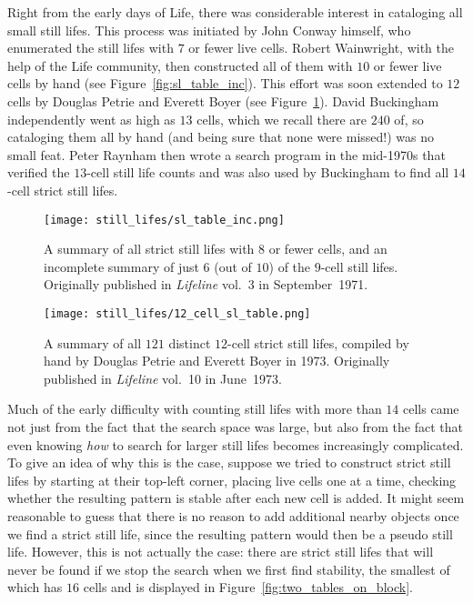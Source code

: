 Right from the early days of Life, there was considerable interest in cataloging all small still lifes. This process was initiated by John Conway himself, who enumerated the still lifes with $7$ or fewer live cells. Robert Wainwright, with the help of the Life community, then constructed all of them with $10$ or fewer live cells by hand (see Figure~\ref{fig:sl_table_inc}). This effort was soon extended to $12$ cells by Douglas Petrie and Everett Boyer (see Figure~\ref{fig:12_cell_sl_table}). David Buckingham independently went as high as $13$ cells, which we recall there are $240$ of, so cataloging them all by hand (and being sure that none were missed!) was no small feat. Peter Raynham then wrote a search program in the mid-1970s that verified the $13$-cell still life counts and was also used by Buckingham to find all $14$-cell strict still lifes.

\begin{figure}[!htb]
	\centering
	\begin{minipage}[b]{0.48\textwidth}
		\centering\texttt{[image: still\_lifes/sl\_table\_inc.png]}
		\caption{A summary of all strict still lifes with $8$ or fewer cells, and an incomplete summary of just $6$ (out of $10$) of the $9$-cell still lifes. Originally published in \emph{Lifeline} vol.~3 in September~1971.}\label{fig:sl_table_inc}
	\end{minipage}\hfill
	\begin{minipage}[b]{0.48\textwidth}
		\centering\texttt{[image: still\_lifes/12\_cell\_sl\_table.png]}
		\caption{A summary of all $121$ distinct $12$-cell strict still lifes, compiled by hand by Douglas Petrie and Everett Boyer in 1973. Originally published in \emph{Lifeline} vol.~10 in June~1973.}\label{fig:12_cell_sl_table}
	\end{minipage}
\end{figure}

Much of the early difficulty with counting still lifes with more than $14$ cells came not just from the fact that the search space was large, but also from the fact that even knowing \emph{how} to search for larger still lifes becomes increasingly complicated. To give an idea of why this is the case, suppose we tried to construct strict still lifes by starting at their top-left corner, placing live cells one at a time, checking whether the resulting pattern is stable after each new cell is added. It might seem reasonable to guess that there is no reason to add additional nearby objects once we find a strict still life, since the resulting pattern would then be a pseudo still life. However, this is not actually the case: there are strict still lifes that will never be found if we stop the search when we first find stability, the smallest of which has $16$ cells and is displayed in Figure~\ref{fig:two_tables_on_block}.

